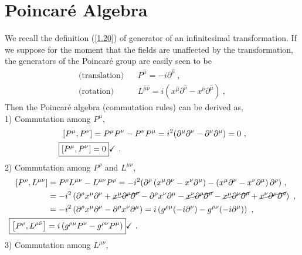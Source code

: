 \documentclass[12pt,a4paper]{report}
\begin{document}
\section{Poincaré Algebra}
We recall the definition (\eqref{1.20}) of generator of an infinitesimal transformation. If we suppose for the moment that the fields are unaffected by the transformation, the generators of the Poincaré group are easily seen to be \cite{Itzykson, Antonin}
\begin{align}
    \text{(translation)}~~~~&P^{\hat{\mu}}=-i\partial^{\hat{\mu}}~,\\\text{(rotation)}~~~~&L^{\hat{\mu}\hat{\nu}}=i\left(x^{\hat{\mu}}\partial^{\hat{\nu}}-x^{\hat{\nu}}\partial^{\hat{\mu}}\right)~,
\end{align}
Then the Poincaré algebra (commutation rules) can be derived as,\\
1) Commutation among $P^\mu$,
\begin{align}
    \left[P^{{\mu}},P^{{\nu}}\right]&=P^{{\mu}}P^{{\nu}}-P^{{\nu}}P^{{\mu}}=i^2(\partial^{{\mu}}\partial^{{\nu}}-\partial^{{\nu}}\partial^{{\mu}})=0\nonumber~,\\
    \Aboxed{\left[P^{{\mu}},P^{{\nu}}\right]&=0}\checkmark~.
    \end{align}
2) Commutation among $P^\rho$ and $L^{{\mu}{\nu}}$,   
\begin{align}
    \left[P^{{\rho}},L^{{\mu}{\nu}}\right]&=P^{{\rho}}L^{{\mu}{\nu}}-L^{{\mu}{\nu}}P^{{\rho}}=-i^2(\partial^{{\rho}}\left(x^{{\mu}}\partial^{{\nu}}-x^{{\nu}}\partial^{{\mu}}\right)-\left(x^{{\mu}}\partial^{{\nu}}-x^{{\nu}}\partial^{{\mu}}\right)\partial^{{\rho}})\nonumber~,\\
    &=-i^2\left(\partial^{{\rho}}x^{{\mu}}\partial^{{\nu}}+\cancel{x^{{\mu}}\partial^{{\rho}}\partial^{{\nu}}}-\partial^{{\rho}}x^{{\nu}}\partial^{{\mu}}-\cancel{x^{{\nu}}\partial^{{\rho}}\partial^{{\mu}}}-\cancel{x^{{\mu}}\partial^{{\nu}}\partial^{{\rho}}}+\cancel{x^{{\nu}}\partial^{{\mu}}\partial^{{\rho}}}\right)\nonumber~,\\
    &=-i^2\left(\partial^{{\rho}}x^{{\mu}}\partial^{{\nu}}-\partial^{{\rho}}x^{{\nu}}\partial^{{\mu}}\right)=i\left(g^{{\rho}{\mu}}(-i\partial^{{\nu}})-g^{{\rho}{\nu}}(-i\partial^{{\mu}})\right)\nonumber~,\\
    \Aboxed{\left[P^{{\rho}},L^{{\mu}\hat{\nu}}\right]&=i\left(g^{{\rho}{\mu}}P^{{\nu}}-g^{{\rho}{\nu}}P^{{\mu}}\right)}\checkmark~.
\end{align}
3) Commutation among $L^{{\mu}{\nu}}$, 
\end{document}
